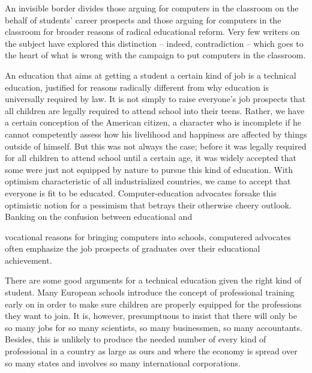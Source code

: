 \documentclass[a4paper]{article}
\begin{document}
\par
An invisible border divides those arguing for computers in the classroom on the behalf of students’ career prospects and those arguing for computers in the classroom for broader reasons of radical educational reform. Very few writers on the subject have explored this distinction -- indeed, contradiction -- which goes to the heart of what is wrong with the campaign to put computers in the classroom.

\par
An education that aims at getting a student a certain kind of job is a technical education, justified for reasons radically different from why education is universally required by law. It is not simply to raise everyone’s job prospects that all children are legally required to attend school into their teens. Rather, we have a certain conception of the American citizen, a character who is incomplete if he cannot competently assess how his livelihood and happiness are affected by things outside of himself. But this was not always the case; before it was legally required for all children to attend school until a certain age, it was widely accepted that some were just not equipped by nature to pursue this kind of education. With optimism characteristic of all industrialized countries, we came to accept that everyone is fit to be educated. Computer-education advocates forsake this optimistic notion for a pessimism that betrays their otherwise cheery outlook. Banking on the confusion between educational and

\par
vocational reasons for bringing computers into schools, computered advocates often emphasize the job prospects of graduates over their educational achievement.

\par
There are some good arguments for a technical education given the right kind of student. Many European schools introduce the concept of professional training early on in order to make sure children are properly equipped for the professions they want to join. It is, however, presumptuous to insist that there will only be so many jobs for so many scientists, so many businessmen, so many accountants. Besides, this is unlikely to produce the needed number of every kind of professional in a country as large as ours and where the economy is spread over so many states and involves so many international corporations.
\end{document}
